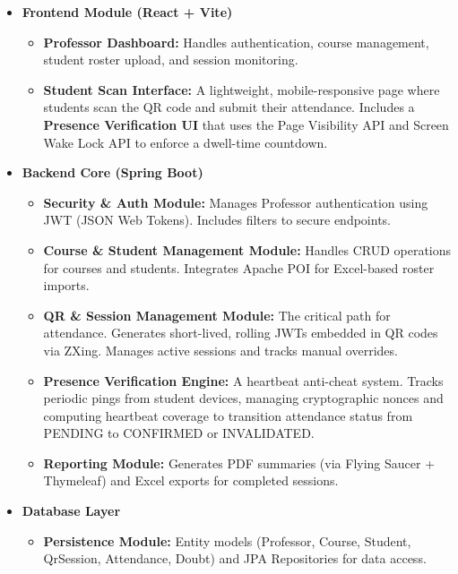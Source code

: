 \documentclass[11pt,a4paper]{article}
\begin{document}
\begin{itemize}
    \item \textbf{Frontend Module (React + Vite)}
    \begin{itemize}
        \item \textbf{Professor Dashboard:} Handles authentication, course management, student roster upload, and session monitoring.
        \item \textbf{Student Scan Interface:} A lightweight, mobile-responsive page where students scan the QR code and submit their attendance. Includes a \textbf{Presence Verification UI} that uses the Page Visibility API and Screen Wake Lock API to enforce a dwell-time countdown.
    \end{itemize}
    
    \item \textbf{Backend Core (Spring Boot)}
    \begin{itemize}
        \item \textbf{Security \& Auth Module:} Manages Professor authentication using JWT (JSON Web Tokens). Includes filters to secure endpoints.
        \item \textbf{Course \& Student Management Module:} Handles CRUD operations for courses and students. Integrates Apache POI for Excel-based roster imports.
        \item \textbf{QR \& Session Management Module:} The critical path for attendance. Generates short-lived, rolling JWTs embedded in QR codes via ZXing. Manages active sessions and tracks manual overrides.
        \item \textbf{Presence Verification Engine:} A heartbeat anti-cheat system. Tracks periodic pings from student devices, managing cryptographic nonces and computing heartbeat coverage to transition attendance status from PENDING to CONFIRMED or INVALIDATED.
        \item \textbf{Reporting Module:} Generates PDF summaries (via Flying Saucer + Thymeleaf) and Excel exports for completed sessions.
    \end{itemize}
    
    \item \textbf{Database Layer}
    \begin{itemize}
        \item \textbf{Persistence Module:} Entity models (Professor, Course, Student, QrSession, Attendance, Doubt) and JPA Repositories for data access.
    \end{itemize}
\end{itemize}
\end{document}
